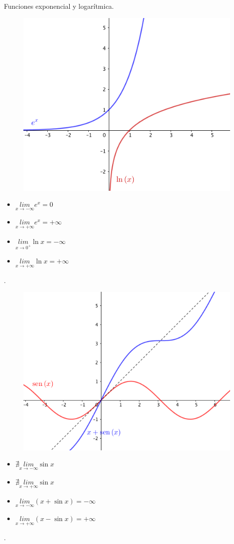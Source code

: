 	   \begin{ejem} Funciones exponencial y logarítmica.
	   	
	   	\begin{multicols}{2}
	    
			\begin{figure}[H]
			\centering
			\includegraphics[width=0.3
			\textwidth]{imagenes/imagenes03/T03IM03.png}
			\end{figure}
		
			\begin{itemize}
			\item $\underset {x \to -\infty}{lim}{e^x}=0$
			\item $\underset {x \to +\infty}{lim}{e^x}=+\infty$
			\item $\underset {x \to 0^+}{lim}{\ln x}=-\infty$
			\item $\underset {x \to +\infty}{lim}{\ln x}=+\infty$
			\end{itemize}
	
	   \end{multicols}
	   	
	   \end{ejem}



		\begin{ejem}.
	   	
	   	\begin{multicols}{2}
	    
			\begin{figure}[H]
			\centering
			\includegraphics[width=0.4
			\textwidth]{imagenes/imagenes03/T03IM04.png}
			\end{figure}
		
			\begin{itemize}
			\item $\nexists \underset {x \to -\infty}{lim}{\sin x}$
			\item $\nexists \underset {x \to +\infty}{lim}{\sin x}$
			\item $\underset {x \to -\infty}{lim}{(x+\sin x)}=-\infty$
			\item $\underset {x \to +\infty}{lim}{(x-\sin x)}=+\infty$
			\end{itemize}
	
	   \end{multicols}
	   	
	   \end{ejem}.
	   
